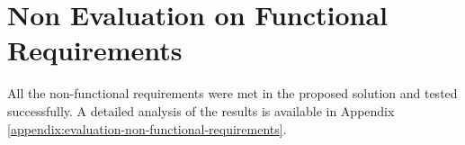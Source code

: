 \section{Non Evaluation on Functional Requirements}

All the non-functional requirements were met in the proposed solution and tested successfully. A detailed analysis of the results is available in Appendix \ref{appendix:evaluation-non-functional-requirements}.